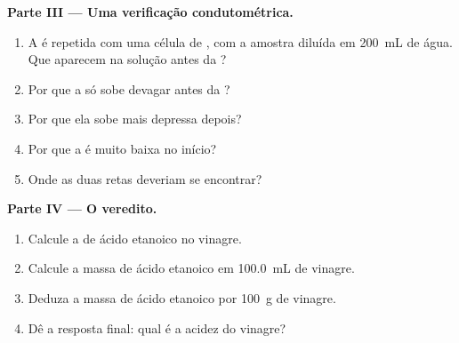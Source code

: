 \begin{problem}
\medskip
\noindent\textbf{Parte III --- Uma verificação condutométrica.}
\begin{enumerate}[resume]
  \item A  é repetida com uma célula de , com a
        amostra diluída em \qty{200}{mL} de água. Que  aparecem na
        solução antes da ?
  \item Por que a  só sobe devagar antes da ?
  \item Por que ela sobe mais depressa depois?
  \item Por que a  é muito baixa no início?
  \item Onde as duas retas deveriam se encontrar?
\end{enumerate}

\medskip
\noindent\textbf{Parte IV --- O veredito.}
\begin{enumerate}[resume]
  \item Calcule a  de ácido etanoico no vinagre.
  \item Calcule a massa de ácido etanoico em \qty{100.0}{mL} de vinagre.
  \item Deduza a massa de ácido etanoico por \qty{100}{g} de vinagre.
  \item Dê a resposta final: qual é a acidez do vinagre?
\end{enumerate}
\end{problem}
